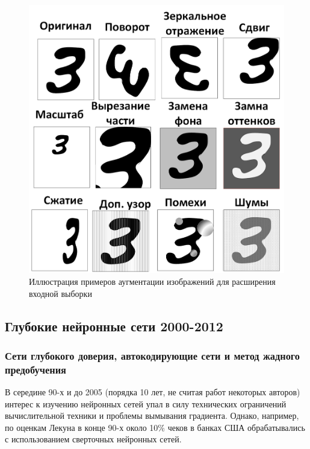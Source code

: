 \documentclass[12pt]{article}
\begin{document}
\begin{sloppypar}
\begin{figure}[!h]
	\begin{center}
		\includegraphics[width=0.6\linewidth]{./figuresch1/Augumentation.png}
		\caption{Иллюстрация примеров аугментации изображений для расширения входной выборки}		
		\label{ch1:fig:augumentation}
	\end{center}
\end{figure}
 


\newpage
\subsection{Глубокие нейронные сети 2000-2012}
\subsubsection{Сети глубокого доверия, автокодирующие сети и метод жадного предобучения}
В середине 90-х и до 2005 (порядка 10 лет, не считая работ некоторых авторов) интерес к изучению нейронных сетей упал в силу технических ограничений вычислительной техники и проблемы вымывания градиента. Однако, например, по оценкам Лекуна \cite{lecun2015deep} в конце 90-х около 10\% чеков в банках США обрабатывались с использованием сверточных нейронных сетей.


\end{sloppypar}
\end{document}
